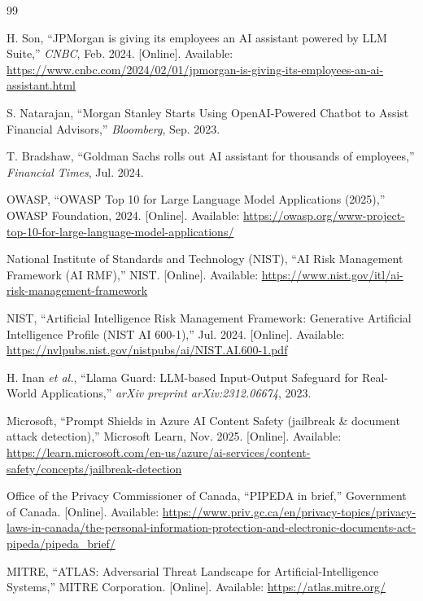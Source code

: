 \documentclass[journal,12pt,onecolumn,draftclsnofoot]{IEEEtran}
\begin{document}
\begin{thebibliography}{99}

H. Son, ``JPMorgan is giving its employees an AI assistant powered by LLM Suite,'' \textit{CNBC}, Feb. 2024. [Online]. Available: \url{https://www.cnbc.com/2024/02/01/jpmorgan-is-giving-its-employees-an-ai-assistant.html}

S. Natarajan, ``Morgan Stanley Starts Using OpenAI-Powered Chatbot to Assist Financial Advisors,'' \textit{Bloomberg}, Sep. 2023.

T. Bradshaw, ``Goldman Sachs rolls out AI assistant for thousands of employees,'' \textit{Financial Times}, Jul. 2024.

OWASP, ``OWASP Top 10 for Large Language Model Applications (2025),'' OWASP Foundation, 2024. [Online]. Available: \url{https://owasp.org/www-project-top-10-for-large-language-model-applications/}

National Institute of Standards and Technology (NIST), ``AI Risk Management Framework (AI RMF),'' NIST. [Online]. Available: \url{https://www.nist.gov/itl/ai-risk-management-framework}

NIST, ``Artificial Intelligence Risk Management Framework: Generative Artificial Intelligence Profile (NIST AI 600-1),'' Jul. 2024. [Online]. Available: \url{https://nvlpubs.nist.gov/nistpubs/ai/NIST.AI.600-1.pdf}

H. Inan \textit{et al.}, ``Llama Guard: LLM-based Input-Output Safeguard for Real-World Applications,'' \textit{arXiv preprint arXiv:2312.06674}, 2023.

Microsoft, ``Prompt Shields in Azure AI Content Safety (jailbreak \& document attack detection),'' Microsoft Learn, Nov. 2025. [Online]. Available: \url{https://learn.microsoft.com/en-us/azure/ai-services/content-safety/concepts/jailbreak-detection}

Office of the Privacy Commissioner of Canada, ``PIPEDA in brief,'' Government of Canada. [Online]. Available: \url{https://www.priv.gc.ca/en/privacy-topics/privacy-laws-in-canada/the-personal-information-protection-and-electronic-documents-act-pipeda/pipeda_brief/}

MITRE, ``ATLAS: Adversarial Threat Landscape for Artificial-Intelligence Systems,'' MITRE Corporation. [Online]. Available: \url{https://atlas.mitre.org/}


\end{thebibliography}
\end{document}
